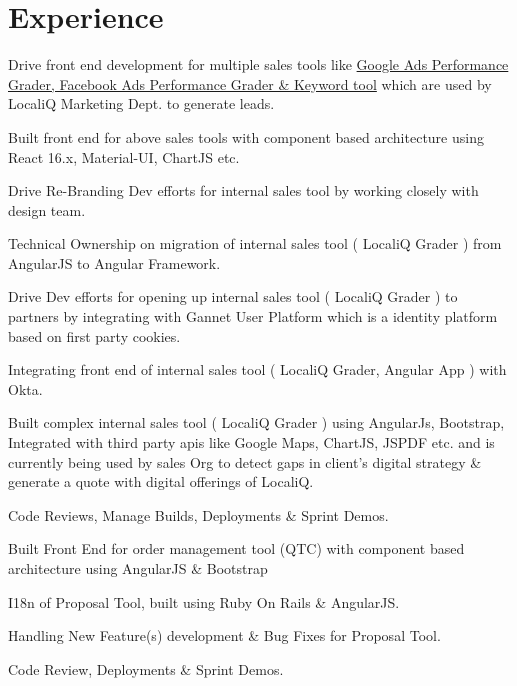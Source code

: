 \documentclass[]{my-resume-openfont}
\begin{document}
\hfill
\begin{minipage}[t]{0.66\textwidth}


\section{Experience}

\vspace{\topsep} %
\begin{tightemize}
\item{Drive front end development for multiple sales tools like \href{https://www.wordstream.com/wordstream-graders}{Google Ads Performance Grader, Facebook Ads Performance Grader \& Keyword tool} which are used by LocaliQ Marketing Dept. to generate leads.}
\item{Built front end for above sales tools with component based architecture using React 16.x, Material-UI, ChartJS etc.}
\item{Drive Re-Branding Dev efforts for internal sales tool by working closely with design team.}
\item{Technical Ownership on migration of internal sales tool ( LocaliQ Grader ) from AngularJS to Angular Framework.}
\item{Drive Dev efforts for opening up internal sales tool ( LocaliQ Grader ) to partners by integrating with Gannet User Platform which is a identity platform based on first party cookies.}
\item{Integrating front end of internal sales tool ( LocaliQ Grader, Angular App ) with Okta.}
\item{Built complex internal sales tool ( LocaliQ Grader ) using AngularJs, Bootstrap, Integrated with third party apis like Google Maps, ChartJS, JSPDF etc. and is currently being used by sales Org to detect gaps in client's digital strategy \& generate a quote with digital offerings of LocaliQ.}
\item{Code Reviews, Manage Builds, Deployments \& Sprint Demos.}
\end{tightemize}
\sectionsep

\begin{tightemize}
\item{Built Front End for order management tool (QTC) with component based architecture using AngularJS \& Bootstrap}
\item{I18n of Proposal Tool, built using Ruby On Rails \& AngularJS.}
\item{Handling New Feature(s) development \& Bug Fixes for Proposal Tool.}
\item{Code Review, Deployments \& Sprint Demos.}
\end{tightemize}
\sectionsep


\end{minipage}
\end{document}
